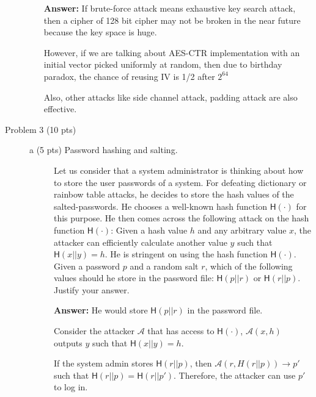 \documentclass[11pt]{article}
\newcommand{\ans}[1]{\begin{mdframed}\textbf{Answer: }#1\end{mdframed}}
\begin{document}
\begin{description}
\begin{itemize}
  \ans{
      If brute-force attack means exhaustive key search attack, then a cipher of 128 bit cipher may not be broken in the near future because the key space is huge.
      
      However, if we are talking about AES-CTR implementation with an initial vector picked uniformly at random, then due to birthday paradox, the chance of reusing IV is 1/2 after $2^{64}$

      Also, other attacks like side channel attack, padding attack are also effective.
  }
\end{itemize}


\item[Problem 3 (10 pts)]
\quad

\begin{description}
        \item [a (5 pts) Password hashing and salting.]
        Let us consider that a system administrator is thinking about
        how to store the user passwords of a system. For defeating dictionary or rainbow table
        attacks, he decides to store the hash values of the salted-passwords. He chooses
        a well-known hash function $\mathsf{H}(\cdot)$ for this purpose. He then comes across
        the following attack on the hash function $\mathsf{H}(\cdot)$: Given a hash value $h$
        and any arbitrary value $x$, the attacker can efficiently calculate another value $y$ such
        that $\mathsf{H}(x||y)=h$. He is stringent on using
        the hash function $\mathsf{H}(\cdot)$. Given a password $p$ and a random salt $r$, which
        of the following values should he store in the password file: $\mathsf{H}(p||r)$ or
        $\mathsf{H}(r||p)$. Justify your answer.
        \ans{
            He would store $\mathsf{H}(p||r)$ in the password file.

            Consider the attacker $\mathcal{A}$ that has access to $\mathsf{H}(\cdot)$, $\mathcal{A}(x,h)$ outputs $y$ such that $\mathsf{H}(x||y)=h$.   
           
            If the system admin stores $\mathsf{H}(r||p)$, then $\mathcal{A}(r,H(r||p)) \rightarrow p'$ such that $\mathsf{H}(r||p)=\mathsf{H}(r||p')$. Therefore, the attacker can use $p'$ to log in.

}
\end{description}
\end{description}
\end{document}
